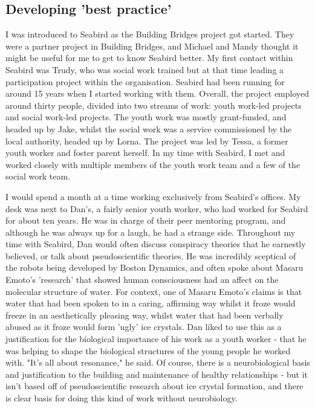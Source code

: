 \subsection{Developing 'best practice'}
\label{subsec:4-seabird}
I was introduced to Seabird as the Building Bridges project got started. They were a partner project in Building Bridges, and Michael and Mandy thought it might be useful for me to get to know Seabird better. My first contact within Seabird was Trudy, who was social work trained but at that time leading a participation project within the organisation. Seabird had been running for around 15 years when I started working with them. Overall, the project employed around thirty people, divided into two streams of work: youth work-led projects and social work-led projects. The youth work was mostly grant-funded, and headed up by Jake, whilst the social work was a service commissioned by the local authority, headed up by Lorna. The project was led by Tessa, a former youth worker and foster parent herself. In my time with Seabird, I met and worked closely with multiple members of the youth work team and a few of the social work team. 

I would spend a month at a time working exclusively from Seabird's offices. My desk was next to Dan's, a fairly senior youth worker,  who had worked for Seabird for about ten years. He was in charge of their peer mentoring program, and although he was always up for a laugh, he had a strange side. Throughout my time with Seabird, Dan would often discuss conspiracy theories that he earnestly believed, or talk about pseudoscientific theories. He was incredibly sceptical of the robots being developed by Boston Dynamics, and often spoke about Masaru Emoto's 'research' that showed human consciousness had an affect on the molecular structure of water. For context, one of Masaru Emoto's claims is that water that had been spoken to in a caring, affirming way whilst it froze would freeze in an aesthetically pleasing way, whilst water that had been verbally abused as it froze would form 'ugly' ice crystals. Dan liked to use this as a justification for the biological importance of his work as a youth worker - that he was helping to shape the biological structures of the young people he worked with. "It's all about resonance," he said. Of course, there is a neurobiological basis and justification to the building and maintenance of healthy relationships - but it isn't based off of pseudoscientific research about ice crystal formation, and there is clear basis for doing this kind of work without neurobiology.


